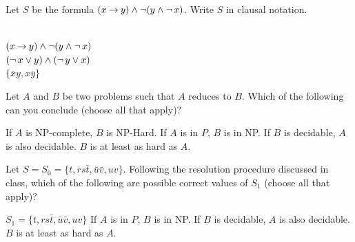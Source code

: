 \documentclass[addpoints]{exam}
\begin{document}
\begin{questions}
\question[2] Let $S$ be the formula $(x \mathbin{\rightarrow} y) \land \mathop{\neg} (y \land \mathop{\neg} x)$. Write $S$ in clausal notation.
\begin{solution}
~\\
$(x \mathbin{\rightarrow} y)\land \mathop{\neg} (y \land \mathop{\neg} x)$\\
$(\mathop{\neg} x \lor y) \land (\mathop{\neg} y \lor x)$\\
$\{\bar{x}y,x\bar{y}\}$\\
\end{solution}
\vspace{30mm}

\question[2] Let $A$ and $B$ be two problems such that $A$ reduces to $B$. Which of
the following can you conclude (choose all that apply)?
\begin{checkboxes}
\CorrectChoice If $A$ is NP-complete, $B$ is NP-Hard.
\choice If $A$ is in $P$, $B$ is in NP. 
\CorrectChoice If $B$ is decidable, $A$ is also decidable.
\CorrectChoice $B$ is at least as hard as $A$.
\end{checkboxes}

\vspace{10mm}
\question Let $S = S_0 = \{t,rs\bar{t},\bar{u}\bar{v},uv\}$. Following the resolution
procedure discussed in class, which of the following are possible correct
values of $S_1$ (choose all that apply)?
\begin{checkboxes}
\CorrectChoice $S_1 = \{t,rs\bar{t},\bar{u}\bar{v},uv\}$ 
\choice If $A$ is in $P$, $B$ is in NP. 
\CorrectChoice If $B$ is decidable, $A$ is also decidable.
\CorrectChoice $B$ is at least as hard as $A$.
\end{checkboxes}


\vspace{5mm}

\end{questions}
\end{document}
